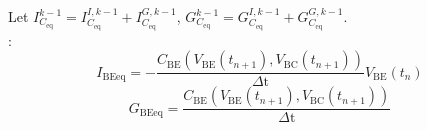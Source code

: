 \documentclass{article}
\begin{document}
Let $I_{C_{\text{eq}}}^{k-1}=I_{C_{\text{eq}}}^{I,k-1}+I_{C_{\text{eq}}}^{G,k-1}$,
$G_{C_{\text{eq}}}^{k-1}=G_{C_{\text{eq}}}^{I,k-1}+G_{C_{\text{eq}}}^{G,k-1}$.\\

:\\
\begin{equation*}
I_{\text{BEeq}}=-\frac{C_{\text{BE}}\left(V_{\text{BE}}\left(t_{n+1}\right),V_{\text{BC}}\left(t_{n+1}\right)\right)}{\text{$\Delta $t}}V_{\text{BE}}\left(t_n\right)
\end{equation*}
\begin{equation*}
G_{\text{BEeq}}=\frac{C_{\text{BE}}\left(V_{\text{BE}}\left(t_{n+1}\right),V_{\text{BC}}\left(t_{n+1}\right)\right)}{\text{$\Delta $t}}
\end{equation*}
\end{document}
